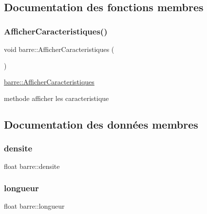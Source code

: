 \subsection{Documentation des fonctions membres}
\mbox{\label{classbarre_a65fd04c5ba981c50569d582a1b5f35b0}} 
\subsubsection{\texorpdfstring{Afficher\+Caracteristiques()}{AfficherCaracteristiques()}}
{\footnotesize\ttfamily void barre\+::\+Afficher\+Caracteristiques (\begin{DoxyParamCaption}{ }\end{DoxyParamCaption})}



\hyperlink{classbarre_a65fd04c5ba981c50569d582a1b5f35b0}{barre\+::\+Afficher\+Caracteristiques} 

methode afficher les caracteristique 

\subsection{Documentation des données membres}
\mbox{\label{classbarre_a41bef49c05b7c407272055ce116f5d9d}} 
\subsubsection{\texorpdfstring{densite}{densite}}
{\footnotesize\ttfamily float barre\+::densite\hspace{0.3cm}{\ttfamily [protected]}}

\mbox{\label{classbarre_acb72acedfbb8c691f29baae6389b8306}} 
\subsubsection{\texorpdfstring{longueur}{longueur}}
{\footnotesize\ttfamily float barre\+::longueur\hspace{0.3cm}{\ttfamily [protected]}}

\mbox{\label{classbarre_ace8c42f734a0b6046dc7c6ef0e1226f5}} 
